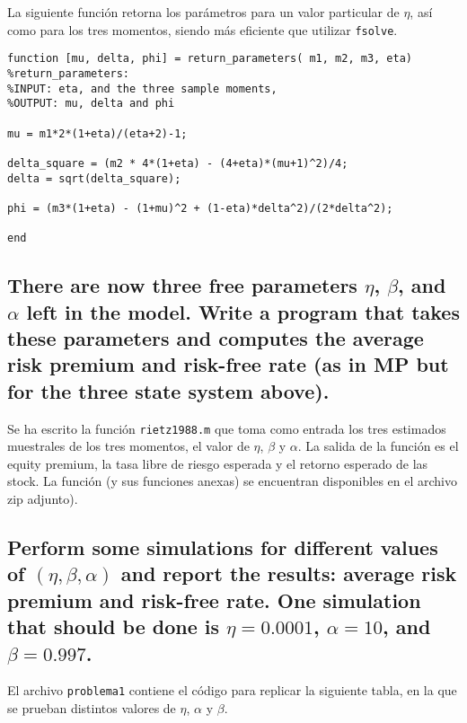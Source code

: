 \documentclass[12pt]{article}
\begin{document}
La siguiente función retorna los parámetros para un valor particular de $\eta$, así como para los tres momentos, siendo más eficiente que utilizar \texttt{fsolve}.


\begin{verbatim}
function [mu, delta, phi] = return_parameters( m1, m2, m3, eta)
%return_parameters: 
%INPUT: eta, and the three sample moments, 
%OUTPUT: mu, delta and phi

mu = m1*2*(1+eta)/(eta+2)-1;

delta_square = (m2 * 4*(1+eta) - (4+eta)*(mu+1)^2)/4;
delta = sqrt(delta_square);

phi = (m3*(1+eta) - (1+mu)^2 + (1-eta)*delta^2)/(2*delta^2);

end

\end{verbatim}

\subsection{There are now three free parameters $\eta$, $\beta$, and $\alpha$ left in the model. Write a program that takes these parameters and computes the average risk premium and risk-free rate (as in MP but for the three state system above).}

Se ha escrito la función \texttt{rietz1988.m} que toma como entrada los tres estimados muestrales de los tres momentos, el valor de $\eta$, $\beta$ y $\alpha$. La salida de la función es el equity premium, la tasa libre de riesgo esperada y el retorno esperado de las stock. La función (y sus funciones anexas) se encuentran disponibles en el archivo zip adjunto).

\subsection{ Perform some simulations for different values of $(\eta,\beta,\alpha)$ and report the results: average risk premium and risk-free rate. One simulation that should be done is $\eta = 0.0001$, $\alpha = 10$, and $\beta = 0.997$.}

El archivo \texttt{problema1} contiene el código para replicar la siguiente tabla, en la que se prueban distintos valores de $\eta$, $\alpha$ y $\beta$.
\end{document}
